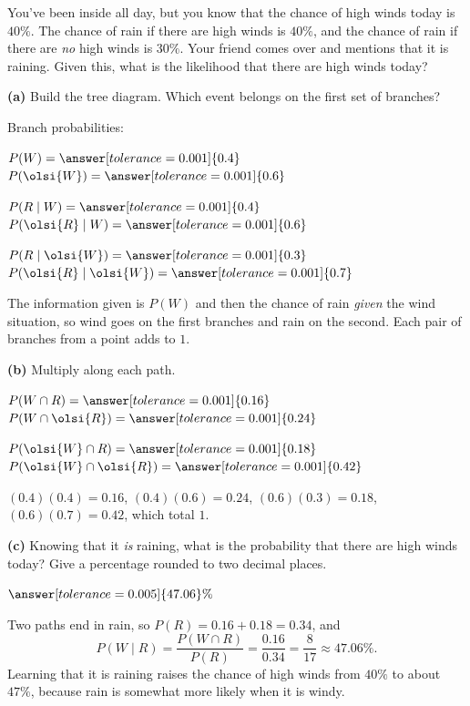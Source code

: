 \documentclass[12pt]{ximera}
\begin{document}
\begin{problem}
You've been inside all day, but you know that the chance of high winds today is $40\%$.
The chance of rain if there are high winds is $40\%$, and the chance of rain if there are
\emph{no} high winds is $30\%$. Your friend comes over and mentions that it is raining.
Given this, what is the likelihood that there are high winds today?

\begin{prompt}
\textbf{(a)} Build the tree diagram. Which event belongs on the first set of branches?

\begin{multipleChoice}
\end{multipleChoice}

Branch probabilities:

$P(W)=\answer[tolerance=0.001]{0.4}$ \qquad $P(\olsi{W})=\answer[tolerance=0.001]{0.6}$

\smallskip
$P(R\mid W)=\answer[tolerance=0.001]{0.4}$ \qquad $P(\olsi{R}\mid W)=\answer[tolerance=0.001]{0.6}$

\smallskip
$P(R\mid \olsi{W})=\answer[tolerance=0.001]{0.3}$ \qquad
$P(\olsi{R}\mid \olsi{W})=\answer[tolerance=0.001]{0.7}$

\begin{feedback}
The information given is $P(W)$ and then the chance of rain \emph{given} the wind
situation, so wind goes on the first branches and rain on the second. Each pair of
branches from a point adds to $1$.
\end{feedback}
\end{prompt}

\begin{prompt}
\textbf{(b)} Multiply along each path.

$P(W\cap R)=\answer[tolerance=0.001]{0.16}$ \qquad
$P(W\cap \olsi{R})=\answer[tolerance=0.001]{0.24}$

\smallskip
$P(\olsi{W}\cap R)=\answer[tolerance=0.001]{0.18}$ \qquad
$P(\olsi{W}\cap \olsi{R})=\answer[tolerance=0.001]{0.42}$

\begin{feedback}
$(0.4)(0.4)=0.16$, $(0.4)(0.6)=0.24$, $(0.6)(0.3)=0.18$, $(0.6)(0.7)=0.42$, which total
$1$. \checkmark
\end{feedback}
\end{prompt}

\begin{prompt}
\textbf{(c)} Knowing that it \emph{is} raining, what is the probability that there are
high winds today? Give a percentage rounded to two decimal places.

$\answer[tolerance=0.005]{47.06}\%$

\begin{feedback}
Two paths end in rain, so $P(R)=0.16+0.18=0.34$, and
\[
P(W\mid R)=\frac{P(W\cap R)}{P(R)}=\frac{0.16}{0.34}=\frac{8}{17}\approx 47.06\%.
\]
Learning that it is raining raises the chance of high winds from $40\%$ to about $47\%$,
because rain is somewhat more likely when it is windy.
\end{feedback}
\end{prompt}
\end{problem}
\end{document}
